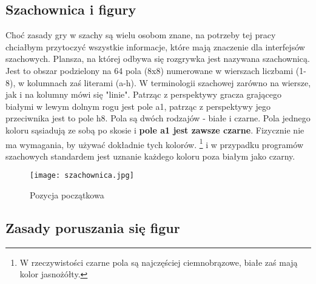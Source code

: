 \documentclass[12pt,leqno]{article}
\begin{document}
\subsection{Szachownica i figury}
Choć zasady gry w szachy są wielu osobom znane, na potrzeby tej pracy chciałbym przytoczyć wszystkie informacje, które mają znaczenie dla interfejsów szachowych. Plansza, na której odbywa się rozgrywka jest nazywana szachownicą. Jest to obszar podzielony na 64 pola (8x8) numerowane w wierszach liczbami (1-8), w kolumnach zaś literami (a-h). W terminologii szachowej zarówno na wiersze, jak i na kolumny mówi się "linie".  Patrząc z perspektywy gracza grającego białymi w lewym dolnym rogu jest pole a1, patrząc z perspektywy jego przeciwnika jest to pole h8. Pola są dwóch rodzajów - białe i czarne. Pola jednego koloru sąsiadują ze sobą po skosie i {\bf  pole a1 jest zawsze czarne}. Fizycznie nie ma wymagania, by używać dokładnie tych kolorów. \footnote { W rzeczywistości czarne pola są najczęściej ciemnobrązowe, białe zaś mają kolor jasnożółty.} i w przypadku programów szachowych standardem jest uznanie każdego koloru poza białym jako czarny.

\begin{figure}
\texttt{[image: szachownica.jpg]}
\caption{Pozycja początkowa}
\end{figure}

\subsection{Zasady poruszania się figur}
\end{document}
